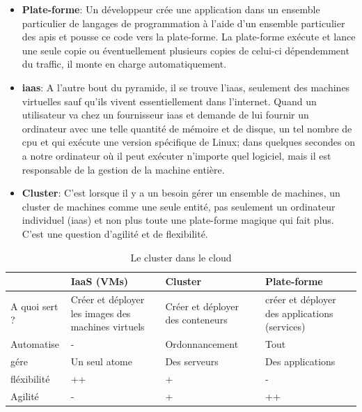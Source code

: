 \begin{onehalfspace}
\begin{itemize}
	\item \textbf{Plate-forme}: Un développeur crée une application dans un ensemble particulier de langages de programmation à l'aide d'un ensemble particulier des \acrshort{api}s et pousse ce code vers la plate-forme. La plate-forme exécute et lance une seule copie ou éventuellement plusieurs copies de celui-ci dépendemment du traffic, il monte en charge automatiquement. 
	\item \textbf{\acrshort{iaas}}: A l'autre bout du pyramide, il se trouve l'\acrshort{iaas}, seulement des machines virtuelles sauf qu'ils vivent essentiellement dans l'internet. Quand un utilisateur va chez un fournisseur \acrshort{iaas} et demande de lui fournir un ordinateur avec une telle quantité de mémoire et de disque, un tel nombre de \acrshort{cpu} et qui exécute une version spécifique de Linux; dans quelques secondes on a notre ordinateur où il peut exécuter n'importe quel logiciel, mais il est responsable de la gestion de la machine entière.
	\item \textbf{Cluster}: C'est lorsque il y a un besoin gérer un ensemble de machines, un cluster de machines comme une seule entité, pas seulement un ordinateur individuel (\acrshort{iaas}) et non plus toute une plate-forme magique qui fait plus. C'est une question d'agilité et de flexibilité.

\end{itemize}


\def\arraystretch{1.6}%

{
\begin{center}
\begin{table}[H]

	\caption{Le cluster dans le cloud \label{tab:table_label}}
	\begin{tabu}{| X[c] | X[c] | X[c] | X[c] |} 


	\hline
	\textbf{} & \textbf{IaaS (VMs)} & \textbf{Cluster} & \textbf{Plate-forme}\\ [0.95ex] 
	\hline\hline
	A quoi sert ? 	& Créer et déployer les images des machines virtuels & Créer et déployer des conteneurs & créer et déployer des applications (services) \\ 
	Automatise					& - & Ordonnancement & Tout \\ 
	gére					& Un seul atome & Des serveurs & Des applications \\ 
	fléxibilité					& ++ 	& + 	& - \\ 
	Agilité						& - 	& + 	& ++ \\ 
	\hline
	\end{tabu}
\end{table}
\end{center}
}



\end{onehalfspace}
